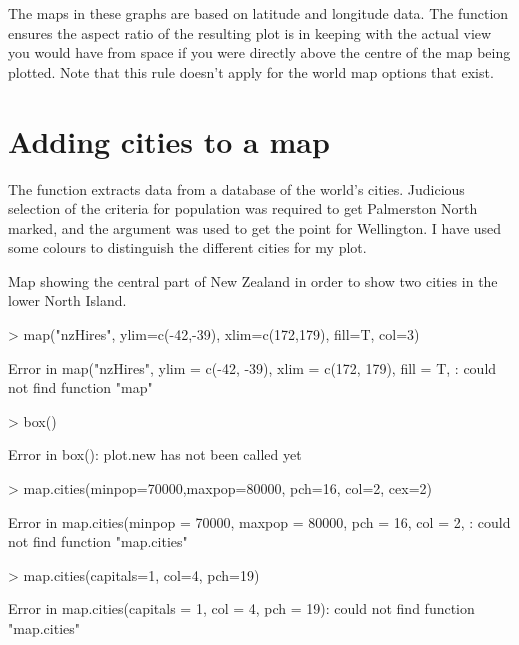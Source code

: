 The maps in these graphs are based on latitude and longitude data. The  function ensures the aspect ratio of the resulting plot is in keeping with the actual view you would have from space if you were directly above the centre of the map being plotted. Note that this rule doesn't apply for the world map options that exist. 
 
\section{Adding cities to a map} 
 
The  function extracts data from a database of the world's cities. Judicious selection of the criteria for population was required to get Palmerston North marked, and the  argument was used to get the point for Wellington. I have used some colours to distinguish the different cities for my plot. 
 
\begin{exhibit} 
\caption{Map showing the central part of New Zealand in order to show two cities in the lower North Island.} 
\label{PartNZ} 
\begin{center} 

\begin{Schunk}
\begin{Sinput}
> map("nzHires", ylim=c(-42,-39), xlim=c(172,179), fill=T, col=3) 
\end{Sinput}
\begin{Soutput}
Error in map("nzHires", ylim = c(-42, -39), xlim = c(172, 179), fill = T, : could not find function "map"
\end{Soutput}
\begin{Sinput}
> box() 
\end{Sinput}
\begin{Soutput}
Error in box(): plot.new has not been called yet
\end{Soutput}
\begin{Sinput}
> map.cities(minpop=70000,maxpop=80000, pch=16, col=2, cex=2) 
\end{Sinput}
\begin{Soutput}
Error in map.cities(minpop = 70000, maxpop = 80000, pch = 16, col = 2, : could not find function "map.cities"
\end{Soutput}
\begin{Sinput}
> map.cities(capitals=1, col=4, pch=19) 
\end{Sinput}
\begin{Soutput}
Error in map.cities(capitals = 1, col = 4, pch = 19): could not find function "map.cities"
\end{Soutput}
\end{Schunk}

\end{center} 
\end{exhibit} 
 
